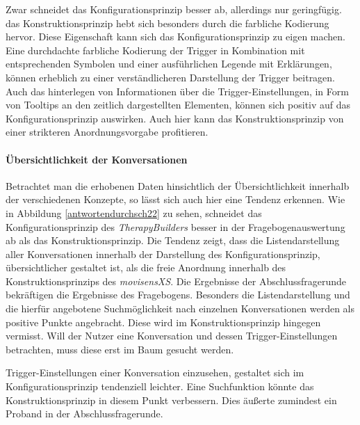 Zwar schneidet das Konfigurationsprinzip besser ab, allerdings nur geringfügig. das Konstruktionsprinzip hebt sich besonders durch die farbliche Kodierung hervor. Diese Eigenschaft kann sich das Konfigurationsprinzip zu eigen machen. Eine durchdachte farbliche Kodierung der Trigger in Kombination mit entsprechenden Symbolen und einer ausführlichen Legende mit Erklärungen, können erheblich zu einer verständlicheren Darstellung der Trigger beitragen. Auch das hinterlegen von Informationen über die Trigger-Einstellungen, in Form von Tooltips an den zeitlich dargestellten Elementen, können sich positiv auf das Konfigurationsprinzip auswirken. Auch hier kann das Konstruktionsprinzip von einer strikteren Anordnungsvorgabe profitieren. 

\paragraph{Übersichtlichkeit der Konversationen}
Betrachtet man die erhobenen Daten hinsichtlich der Übersichtlichkeit innerhalb der verschiedenen Konzepte, so lässt sich auch hier eine Tendenz erkennen. Wie in Abbildung \ref{antwortendurchsch22} zu sehen, schneidet das Konfigurationsprinzip des \emph{TherapyBuilders} besser in der Fragebogenauswertung ab als das Konstruktionsprinzip. Die Tendenz zeigt, dass die Listendarstellung aller Konversationen innerhalb der Darstellung des Konfigurationsprinzip, übersichtlicher gestaltet ist, als die freie Anordnung innerhalb des Konstruktionsprinzips des \emph{movisensXS}. Die Ergebnisse der Abschlussfragerunde bekräftigen die Ergebnisse des Fragebogens. Besonders die Listendarstellung und die hierfür angebotene Suchmöglichkeit nach einzelnen Konversationen werden als positive Punkte angebracht. Diese wird im Konstruktionsprinzip hingegen vermisst. Will der Nutzer eine Konversation und dessen Trigger-Einstellungen betrachten, muss diese erst im Baum gesucht werden. 

Trigger-Einstellungen einer Konversation einzusehen, gestaltet sich im Konfigurationsprinzip tendenziell leichter. Eine Suchfunktion könnte das Konstruktionsprinzip in diesem Punkt verbessern. Dies äußerte zumindest ein Proband in der Abschlussfragerunde.


